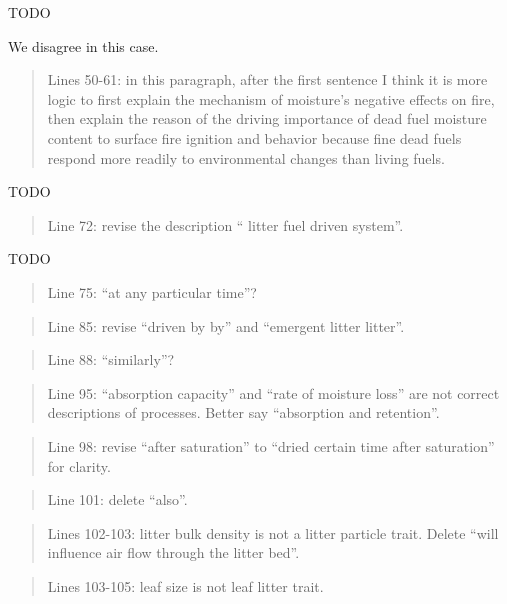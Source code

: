 \documentclass[letterpaper, 12pt]{letter}
\begin{document}
\begin{letter}{}
TODO

We disagree in this case. 

\begin{quote}
Lines 50-61: in this paragraph, after the first sentence I think it is more logic to first explain the mechanism of moisture’s negative effects on fire, then explain the reason of the driving importance of dead fuel moisture content to surface fire ignition and behavior because fine dead fuels respond more readily to environmental changes than living fuels.
\end{quote}

TODO

\begin{quote}
Line 72: revise the description “ litter fuel driven system”.
\end{quote}

TODO

\begin{quote}
Line 75: “at any particular time”?
\end{quote}

\begin{quote}
Line 85: revise “driven by by” and “emergent litter litter”.
\end{quote}

\begin{quote}
Line 88: “similarly”?
\end{quote}

\begin{quote}
Line 95: “absorption capacity” and “rate of moisture loss” are not correct descriptions of processes. Better say “absorption and retention”.
\end{quote}

\begin{quote}
Line 98: revise “after saturation” to “dried certain time after saturation” for clarity.
\end{quote}

\begin{quote}
Line 101: delete “also”.
\end{quote}

\begin{quote}
Lines 102-103: litter bulk density is not a litter particle trait. Delete “will influence air flow through the litter bed”.
\end{quote}

\begin{quote}
Lines 103-105: leaf size is not leaf litter trait.
\end{quote}


\end{letter}
\end{document}
